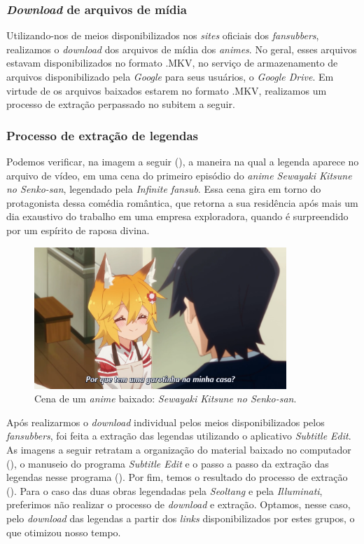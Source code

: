\documentclass[portuguese]{textolivre}
\begin{document}
\subsubsection{\textit{Download} de arquivos de mídia}\label{sec-modelo}
Utilizando-nos de meios disponibilizados nos \textit{sites} oficiais dos \textit{fansubbers}, realizamos o \textit{download} dos arquivos de mídia dos \textit{animes}. No geral, esses arquivos estavam disponibilizados no formato .MKV, no serviço de armazenamento de arquivos disponibilizado pela \textit{Google} para seus usuários, o \textit{Google Drive}. Em virtude de os arquivos baixados estarem no formato .MKV, realizamos um processo de extração perpassado no subitem a seguir.

\subsubsection{Processo de extração de legendas}\label{sec-organizacao}
Podemos verificar, na imagem a seguir (), a maneira na qual a legenda aparece no arquivo de vídeo, em uma cena do primeiro episódio do \textit{anime Sewayaki Kitsune no Senko-san}, legendado pela \textit{Infinite fansub}. Essa cena gira em torno do protagonista dessa comédia romântica, que retorna a sua residência após mais um dia exaustivo do trabalho em uma empresa exploradora, quando é surpreendido por um espírito de raposa divina. 

\begin{figure}[h!]
 \centering
 \includegraphics[width=0.85\textwidth]{Fig1.png}
 \caption{Cena de um \textit{anime} baixado: \textit{Sewayaki Kitsune no Senko-san}.}
 \label{fig01}
\end{figure}

Após realizarmos o \textit{download} individual pelos meios disponibilizados pelos \textit{fansubbers}, foi feita a extração das legendas utilizando o aplicativo \textit{Subtitle Edit}. As imagens a seguir retratam a organização do material baixado no computador (), o manuseio do programa \textit{Subtitle Edit} e o passo a passo da extração das legendas nesse programa (). Por fim, temos o resultado do processo de extração (). Para o caso das duas obras legendadas pela \textit{Seoltang} e pela \textit{Illuminati}, preferimos não realizar o processo de \textit{download} e extração. Optamos, nesse caso, pelo \textit{download} das legendas a partir dos \textit{links} disponibilizados por estes grupos, o que otimizou nosso tempo.
\end{document}
